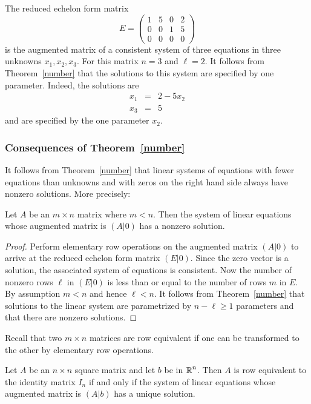 \documentclass{ximera}
\begin{document}
The reduced echelon form matrix
\[
E = \left(\begin{array}{ccc|c} 1 & 5 & 0 & 2 \\ 0 & 0 & 1 & 5\\
	0 & 0 & 0 & 0 \end{array}\right)
\]
is the augmented matrix of a consistent system of three equations
in three unknowns $x_1,x_2,x_3$.  For this matrix $n=3$ and $\ell=2$.
It follows from Theorem~\ref{number} that the solutions to this system
are specified by one parameter.  Indeed, the solutions are
\begin{eqnarray*}
x_1 & = & 2 - 5x_2\\
x_3 & = & 5
\end{eqnarray*}
and are specified by the one parameter $x_2$.


\subsubsection*{Consequences of Theorem~\ref{number}}

It follows from Theorem~\ref{number} that linear systems of equations
with fewer equations than unknowns and with zeros on the right hand
side always have nonzero solutions.  More precisely:
\begin{corollary}  \label{existencehomo}
Let $A$ be an $m\times n$ matrix where $m<n$.  Then the system of
linear equations whose augmented matrix is $(A|0)$ has a nonzero
solution.
\end{corollary}

\begin{proof} Perform elementary row operations on the augmented matrix $(A|0)$
to arrive at the reduced echelon form matrix $(E|0)$.  Since the zero
vector is a solution, the associated system of equations is consistent.
Now the number of nonzero rows $\ell$ in $(E|0)$ is less than or equal to
the number of rows $m$ in $E$.  By assumption $m<n$ and hence $\ell<n$.
It follows from Theorem~\ref{number} that solutions to the linear system
are parametrized by $n-\ell \ge 1$ parameters and that there are nonzero
solutions.   \end{proof}

Recall that two $m\times n$ matrices are row equivalent if one
can be transformed to the other by elementary row operations.

\begin{corollary}  \label{consistent}
Let $A$ be an $n\times n$ square matrix and let $b$ be in
$\mbox{$\Bbb{R}$}^n$.  Then $A$ is row equivalent to the identity matrix $I_n$
if and only if the system of linear equations whose augmented
matrix is $(A|b)$ has a unique solution.
\end{corollary}   
\end{document}
